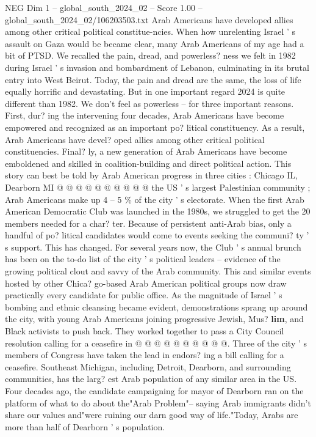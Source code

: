 \begin{textsample}{NEG Dim 1 – global\_south\_2024\_02 – Score 1.00 – global\_south\_2024\_02/106203503.txt}  \label{ex:f1_neg_256}
Arab Americans have developed allies among other critical political constitue-ncies.
When how unrelenting Israel ' s assault on Gaza would be became clear, many Arab Americans of my age had a bit of PTSD.
We recalled the pain, dread, and powerless? ness we felt in 1982 during Israel ' s invasion and bombardment of Lebanon, culminating in its brutal entry into West Beirut.
Today, the pain and dread are the same, the loss of life equally horrific and devastating.
But in one important regard 2024 is quite different than 1982.
We don't feel as powerless -- for three important reasons.
First, dur? ing the intervening four decades, Arab Americans have become empowered and recognized as an important po? litical constituency.
As a result, Arab Americans have devel? oped allies among other critical political constituencies.
Final? ly, a new generation of Arab Americans have become emboldened and skilled in coalition-building and direct political action.
This story can best be told by Arab American progress in three cities : Chicago IL, Dearborn MI @ @ @ @ @ @ @ @ @ @ the US ' s largest Palestinian community ; Arab Americans make up 4 -- 5 \% of the city ' s electorate.
When the first Arab American Democratic Club was launched in the 1980s, we struggled to get the 20 members needed for a char? ter.
Because of persistent anti-Arab bias, only a handful of po? litical candidates would come to events seeking the communi? ty ' s support.
This has changed.
For several years now, the Club ' s annual brunch has been on the to-do list of the city ' s political leaders -- evidence of the growing political clout and savvy of the Arab community.
This and similar events hosted by other Chica? go-based Arab American political groups now draw practically every candidate for public office.
As the magnitude of Israel ' s bombing and ethnic cleansing became evident, demonstrations sprang up around the city, with young Arab Americans joining progressive Jewish, Mus? \textbf{lim}, and Black activists to push back.
They worked together to pass a City Council resolution calling for a ceasefire in @ @ @ @ @ @ @ @ @ @.
Three of the city ' s members of Congress have taken the lead in endors? ing a bill calling for a ceasefire.
Southeast Michigan, including Detroit, Dearborn, and surrounding communities, has the larg? est Arab population of any similar area in the US.
Four decades ago, the candidate campaigning for mayor of Dearborn ran on the platform of what to do about the"Arab Problem"-- saying Arab immigrants didn't share our values and"were ruining our darn good way of life."Today, Arabs are more than half of Dearborn ' s population.

\end{textsample}
